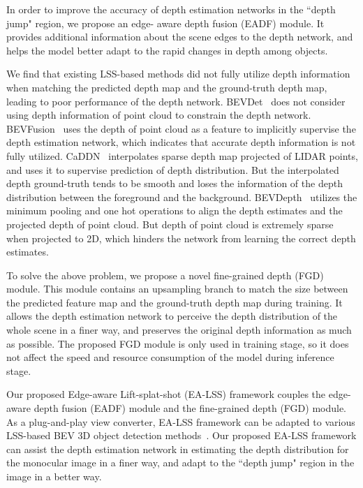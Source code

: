 \documentclass[letterpaper]{article} \usepackage[submission]{aaai24}  \usepackage{times}  \usepackage{helvet}  \usepackage{courier}  \usepackage[hyphens]{url}  \usepackage{graphicx} \urlstyle{rm} \def\UrlFont{\rm}  \usepackage{natbib}  \usepackage{caption} \frenchspacing  \setlength{\pdfpagewidth}{8.5in} \setlength{\pdfpageheight}{11in} \usepackage{algorithm}
\begin{document}
In order to improve the accuracy of depth estimation networks in the ``depth jump" region, we propose an edge-
aware depth fusion (EADF) module. It provides additional information about the scene edges to the depth network, and helps the model better adapt to the rapid changes in depth among objects.

We find that existing LSS-based methods did not fully utilize depth information when matching the predicted depth map and the ground-truth depth map, leading to poor performance of the depth network. BEVDet~\cite{huang2021bevdet} does not consider using depth information of point cloud to constrain the depth network. BEVFusion~\cite{liang2022bevfusion} uses the depth of point cloud as a feature to implicitly supervise the depth estimation network, which indicates that accurate depth information is not fully utilized. CaDDN~\cite{CaDDN} interpolates sparse depth map projected of LIDAR points, and uses it to supervise prediction of depth distribution. But the interpolated depth ground-truth tends to be smooth and loses the information of the depth distribution between the foreground and the background. BEVDepth~\cite{li2022bevdepth} utilizes the minimum pooling and one hot operations to align the depth estimates and the projected depth of point cloud. But depth of point cloud is extremely sparse when projected to 2D, which hinders the network from learning the correct depth estimates.

To solve the above problem, we propose a novel fine-grained depth (FGD) module. This module contains an upsampling branch to match the size between the predicted feature map and the ground-truth depth map during training. It allows the depth estimation network to perceive the depth distribution of the whole scene in a finer way, and preserves the original depth information as much as possible. The proposed FGD module is only used in training stage, so it does not affect the speed and resource consumption of the model during inference stage.

Our proposed Edge-aware Lift-splat-shot (EA-LSS) framework couples the edge-aware depth fusion (EADF) module and the fine-grained depth (FGD) module. As a plug-and-play view converter, EA-LSS framework can be adapted to various LSS-based BEV 3D object detection methods~\cite{huang2021bevdet,liang2022bevfusion, CaDDN, li2022bevdepth}. Our proposed EA-LSS framework can assist the depth estimation network in estimating the depth distribution for the monocular image in a finer way, and adapt to the ``depth jump" region in the image in a better way. 
\end{document}
